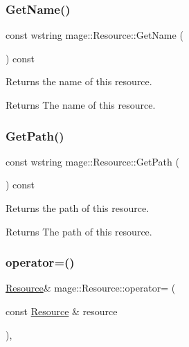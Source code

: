 \subsubsection{\texorpdfstring{Get\+Name()}{GetName()}}
{\footnotesize\ttfamily const wstring mage\+::\+Resource\+::\+Get\+Name (\begin{DoxyParamCaption}{ }\end{DoxyParamCaption}) const}

Returns the name of this resource.

\begin{DoxyReturn}{Returns}
The name of this resource. 
\end{DoxyReturn}
\hypertarget{classmage_1_1_resource_a82a540b610f04adc251771ec6fe8e535}{}\label{classmage_1_1_resource_a82a540b610f04adc251771ec6fe8e535} 
\subsubsection{\texorpdfstring{Get\+Path()}{GetPath()}}
{\footnotesize\ttfamily const wstring mage\+::\+Resource\+::\+Get\+Path (\begin{DoxyParamCaption}{ }\end{DoxyParamCaption}) const}

Returns the path of this resource.

\begin{DoxyReturn}{Returns}
The path of this resource. 
\end{DoxyReturn}
\hypertarget{classmage_1_1_resource_ad8fa57f37eb253b90d18d33383b12875}{}\label{classmage_1_1_resource_ad8fa57f37eb253b90d18d33383b12875} 
\subsubsection{\texorpdfstring{operator=()}{operator=()}}
{\footnotesize\ttfamily \hyperlink{classmage_1_1_resource}{Resource}\& mage\+::\+Resource\+::operator= (\begin{DoxyParamCaption}\item[{const \hyperlink{classmage_1_1_resource}{Resource} \&}]{resource }\end{DoxyParamCaption})\hspace{0.3cm}{\ttfamily [private]}, {\ttfamily [delete]}}

